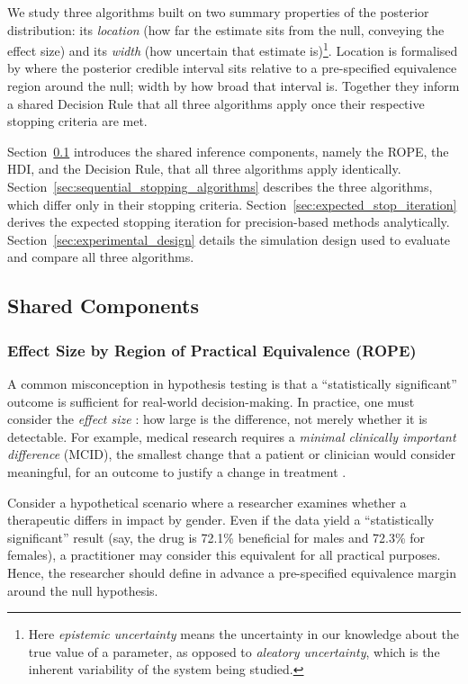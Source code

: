 We study three algorithms built on two summary properties of the posterior
distribution: its \textit{location} (how far the estimate sits from the null,
conveying the effect size) and its \textit{width} (how uncertain that estimate
is)\footnote{Here \textit{epistemic uncertainty} means the uncertainty in our
knowledge about the true value of a parameter, as opposed to
\textit{aleatory uncertainty}, which is the inherent variability of the system
being studied.}.
Location is formalised by where the posterior credible interval sits relative to a
pre-specified equivalence region around the null; width by how broad that interval is.
Together they inform a shared Decision Rule that all three algorithms apply once
their respective stopping criteria are met.

Section~\ref{sec:shared_components} introduces the shared inference components,
namely the ROPE, the HDI, and the Decision Rule, that all three algorithms apply
identically.
Section~\ref{sec:sequential_stopping_algorithms} describes the three algorithms,
which differ only in their stopping criteria.
Section~\ref{sec:expected_stop_iteration} derives the expected stopping iteration for
precision-based methods analytically.
Section~\ref{sec:experimental_design} details the simulation design used to evaluate
and compare all three algorithms.

\subsection{Shared Components}\label{sec:shared_components}

\subsubsection{Effect Size by Region of Practical Equivalence (ROPE)}\label{sec:rope}

A common misconception in hypothesis testing is that a ``statistically significant'' outcome is sufficient for real-world decision-making. In practice, one must consider the \textit{effect size} \citep{cohen1988}: how large is the difference, not merely whether it is detectable. For example, medical research requires a \textit{minimal clinically important difference} (MCID), the smallest change that a patient or clinician would consider meaningful, for an outcome to justify a change in treatment \citep{jaeschke1989}.

Consider a hypothetical scenario where a researcher examines whether a therapeutic
differs in impact by gender.
Even if the data yield a ``statistically significant'' result (say, the drug is
72.1\% beneficial for males and 72.3\% for females), a practitioner may consider
this equivalent for all practical purposes.
Hence, the researcher should define in advance a pre-specified equivalence margin
around the null hypothesis.

